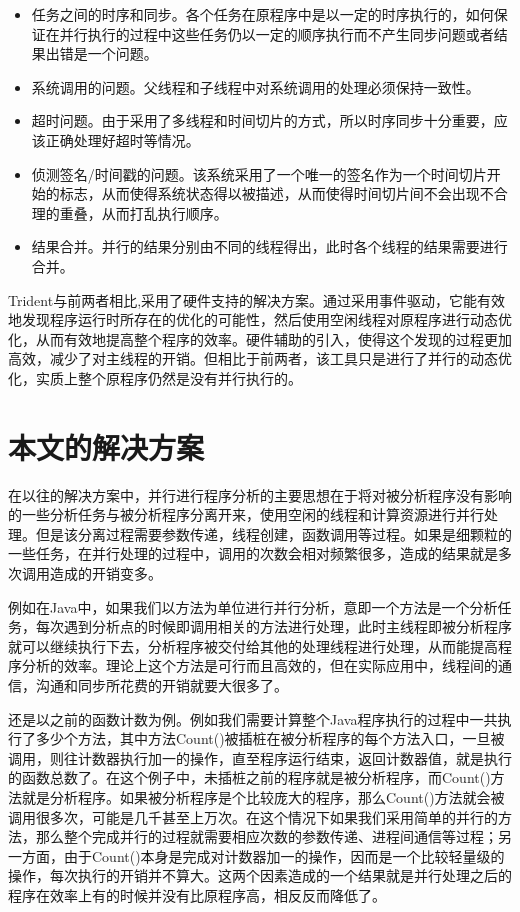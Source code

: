 \begin{itemize}
	\item 任务之间的时序和同步。各个任务在原程序中是以一定的时序执行的，如何保证在并行执行的过程中这些任务仍以一定的顺序执行而不产生同步问题或者结果出错是一个问题。
	\item 系统调用的问题。父线程和子线程中对系统调用的处理必须保持一致性。
	\item 超时问题。由于采用了多线程和时间切片的方式，所以时序同步十分重要，应该正确处理好超时等情况。
	\item 侦测签名/时间戳的问题。该系统采用了一个唯一的签名作为一个时间切片开始的标志，从而使得系统状态得以被描述，从而使得时间切片间不会出现不合理的重叠，从而打乱执行顺序。
	\item 结果合并。并行的结果分别由不同的线程得出，此时各个线程的结果需要进行合并。
\end{itemize}

Trident\cite{eventDri}与前两者相比,采用了硬件支持的解决方案。通过采用事件驱动，它能有效地发现程序运行时所存在的优化的可能性，然后使用空闲线程对原程序进行动态优化，从而有效地提高整个程序的效率。硬件辅助的引入，使得这个发现的过程更加高效，减少了对主线程的开销。但相比于前两者，该工具只是进行了并行的动态优化，实质上整个原程序仍然是没有并行执行的。

\section{本文的解决方案}

在以往的解决方案中，并行进行程序分析的主要思想在于将对被分析程序没有影响的一些分析任务与被分析程序分离开来，使用空闲的线程和计算资源进行并行处理。但是该分离过程需要参数传递，线程创建，函数调用等过程。如果是细颗粒的一些任务，在并行处理的过程中，调用的次数会相对频繁很多，造成的结果就是多次调用造成的开销变多。

例如在Java中，如果我们以方法为单位进行并行分析，意即一个方法是一个分析任务，每次遇到分析点的时候即调用相关的方法进行处理，此时主线程即被分析程序就可以继续执行下去，分析程序被交付给其他的处理线程进行处理，从而能提高程序分析的效率。理论上这个方法是可行而且高效的，但在实际应用中，线程间的通信，沟通和同步所花费的开销就要大很多了。

还是以之前的函数计数为例。例如我们需要计算整个Java程序执行的过程中一共执行了多少个方法，其中方法Count()被插桩在被分析程序的每个方法入口，一旦被调用，则往计数器执行加一的操作，直至程序运行结束，返回计数器值，就是执行的函数总数了。在这个例子中，未插桩之前的程序就是被分析程序，而Count()方法就是分析程序。如果被分析程序是个比较庞大的程序，那么Count()方法就会被调用很多次，可能是几千甚至上万次。在这个情况下如果我们采用简单的并行的方法，那么整个完成并行的过程就需要相应次数的参数传递、进程间通信等过程；另一方面，由于Count()本身是完成对计数器加一的操作，因而是一个比较轻量级的操作，每次执行的开销并不算大。这两个因素造成的一个结果就是并行处理之后的程序在效率上有的时候并没有比原程序高，相反反而降低了。

